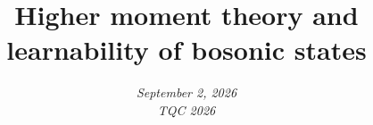 \title[Boson learning]{Higher moment theory and learnability of bosonic states} %


\author[J. Iosue et al.]{
    \iosuename
}

\date[\secname]{\small \em September 2, 2026 \\ TQC 2026}
